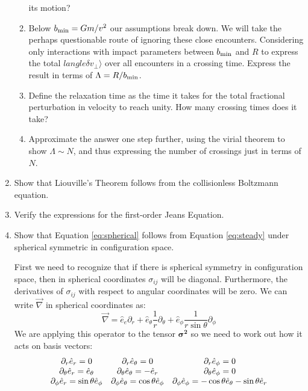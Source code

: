 \begin{enumerate}
\begin{enumerate}
its motion?
\item Below $b_{\rm min} = Gm/v^2$ our assumptions break down. We will
take the perhaps questionable route of ignoring these close
encounters. Considering only interactions with impact parameters
between $b_{\rm min}$ and $R$ to express the total
$langle \delta v_\perp\rangle$ over all encounters in a crossing
time. Express the result in terms of $\Lambda = R/b_{\rm min}$.
\item Define the relaxation time as the time it takes for the total
fractional perturbation in velocity to reach unity. How many crossing
times does it take?
\item Approximate the answer one step further, using the
virial theorem to show $\Lambda \sim N$, and thus expressing the
number of crossings just in terms of $N$.
\end{enumerate}
\item Show that Liouville's Theorem follows from the collisionless
Boltzmann equation. 
\item Verify the expressions for the first-order Jeans Equation. 
\item Show that Equation \ref{eq:spherical} follows from
Equation \ref{eq:steady} under spherical symmetric in configuration
space. 
\begin{answer}
First we need to recognize that if there is spherical symmetry in
configuration space, then in spherical coordinates $\sigma_{ij}$ will
be diagonal. Furthermore, the derivatives of $\sigma_{ij}$ with
respect to angular coordinates will be zero. We can write
$\vec{\nabla}$ in spherical coordinates as:
\begin{equation}
\vec{\nabla} = {\hat e}_e \partial_r + {\hat
e}_\theta \frac{1}{r} \partial_\theta + {\hat
e}_\phi \frac{1}{r\sin\theta} \partial_\phi
\end{equation}
We are applying this operator to the tensor $\mathbf{\sigma^2}$ so we
need to work out how it acts on basis vectors:
\begin{equation}
\begin{array}{ccc}
\partial_r {\hat e}_r = 0 & 
\partial_r {\hat e}_\theta = 0 &
\partial_r {\hat e}_\phi = 0 \cr
\partial_\theta {\hat e}_r = {\hat e}_\theta & 
\partial_\theta {\hat e}_\theta = - {\hat e}_r &
\partial_\theta {\hat e}_\phi = 0 \cr
\partial_\phi {\hat e}_r = \sin\theta {\hat e}_\phi & 
\partial_\phi {\hat e}_\theta = \cos\theta {\hat e}_\phi &
\partial_\phi {\hat e}_\phi = - \cos\theta {\hat e}_\theta - \sin\theta {\hat e}_r \cr
\end{array}

\end{equation}
\end{answer}
\end{enumerate}
